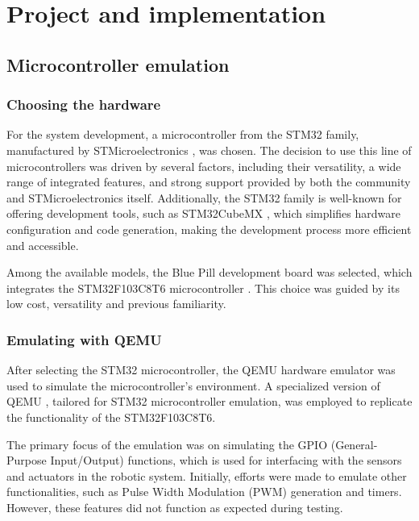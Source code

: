 \documentclass[../../monografia.tex]{subfiles}
\begin{document}
\chapter{Project and implementation}

\section{Microcontroller emulation}

\subsection{Choosing the hardware}

For the system development, a microcontroller from the STM32 family, manufactured by STMicroelectronics \cite{STMicroelectronics_23}, was chosen. The decision to use this line of microcontrollers was driven by several factors, including their versatility, a wide range of integrated features, and strong support provided by both the community and STMicroelectronics itself. Additionally, the STM32 family is well-known for offering development tools, such as STM32CubeMX \cite{STM32CubeMX_23}, which simplifies hardware configuration and code generation, making the development process more efficient and accessible. 

Among the available models, the Blue Pill \cite{BluePill_23} development board was selected, which integrates the STM32F103C8T6 microcontroller \cite{STM32F103C8T6_Datasheet_23}. This choice was guided by its low cost, versatility and previous familiarity.

\subsection{Emulating with QEMU}

After selecting the STM32 microcontroller, the QEMU hardware emulator was used to simulate the microcontroller’s environment. A specialized version of QEMU \cite{QEMU_STM32_23}, tailored for STM32 microcontroller emulation, was employed to replicate the functionality of the STM32F103C8T6.

The primary focus of the emulation was on simulating the GPIO (General-Purpose Input/Output) functions, which is used for interfacing with the sensors and actuators in the robotic system. Initially, efforts were made to emulate other functionalities, such as Pulse Width Modulation (PWM) generation and timers. However, these features did not function as expected during testing.
\end{document}
